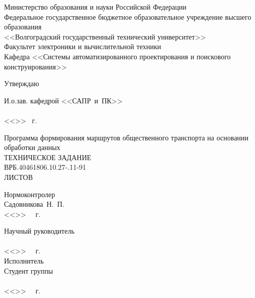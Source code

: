 
\thispagestyle{empty}
\begin{center}
    Министерство образования и науки Российской Федерации \\
    Федеральное государственное бюджетное образовательное учреждение высшего образования\\
    <<Волгоградский государственный технический университет>>\\
    Факультет электроники и вычислительной техники\\
    Кафедра <<Системы автоматизированного проектирования и поискового конструирования>>
    \vspace{1em}
\end{center}
\begin{flushright}
    \begin{center}
        \hspace*{10.5em}Утверждаю
    \end{center}
    И.о.зав. кафедрой <<САПР~и~ПК>>\\
    \quad{}\\
    <<\underline{\hspace{2em}}>> \underline{\hspace{7.5em}} \the\year\ г.
\end{flushright}
\begin{center}
    Программа формирования маршрутов общественного транспорта на основании обработки данных\\
    ТЕХНИЧЕСКОЕ ЗАДАНИЕ\\
    \vspace{2em}
    ВРБ.40461806.10.27-\SPECIFICATION.11-91\\
    ЛИСТОВ \SPAGES
\end{center}
\vspace{5em}
\begin{minipage}[t]{0.6\textwidth}
    \vspace{4em}
    \begin{flushleft}
        Нормоконтролер\\
        Садовникова~Н.~П.\\
        <<\LINE{1.5em}>>\ \LINE{7em} \the\year\ г.
    \end{flushleft}
\end{minipage}
\begin{minipage}[t]{0.39\textwidth}
    \begin{flushleft}
        Научный руководитель\\
        \underline{}\\
        <<\LINE{1.5em}>>\ \LINE{7em} \the\year\ г.\\
        Исполнитель\\
        Студент группы\\
        \underline{}\\
        <<\LINE{1.5em}>>\ \LINE{7em} \the\year\ г.\\
    \end{flushleft}
\end{minipage}
